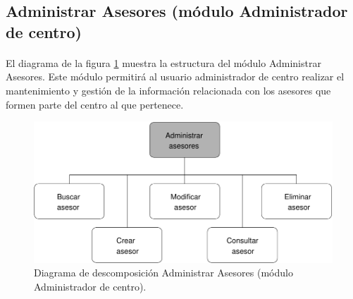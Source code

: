 \subsection{Administrar Asesores (módulo Administrador de centro)}

  \paragraph{}El diagrama de la figura
  \ref{diagramaDescomposicionAdministrarAsesores-admCentro} muestra la
  estructura del módulo Administrar Asesores. Este módulo permitirá al usuario
  administrador de centro realizar el mantenimiento y gestión de la información
  relacionada con los asesores que formen parte del centro al que pertenece.

  \begin{figure}[!ht]
    \begin{center}
      \includegraphics[]{11.Disenyo_Arquitectonico/11.2.Diagramas_Descomposicion/11.2.3.Modulo_administrador_centro/AdministrarBBDD/AdministrarUsuarios/AdministrarAsesores/Diagramas/administrar_asesores.pdf}
      \caption{Diagrama de descomposición Administrar Asesores (módulo Administrador de centro).}
      \label{diagramaDescomposicionAdministrarAsesores-admCentro}
    \end{center}
  \end{figure}
